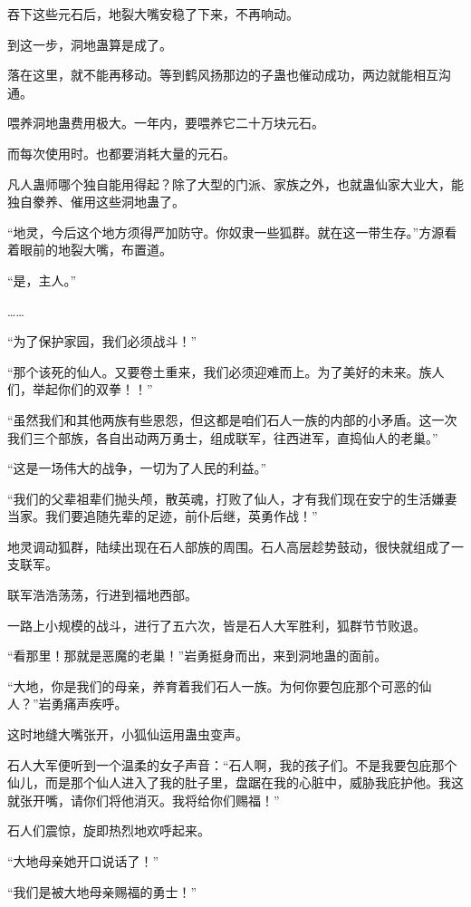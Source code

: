 \begin{this_body}
吞下这些元石后，地裂大嘴安稳了下来，不再响动。

到这一步，洞地蛊算是成了。

落在这里，就不能再移动。等到鹤风扬那边的子蛊也催动成功，两边就能相互沟通。

喂养洞地蛊费用极大。一年内，要喂养它二十万块元石。

而每次使用时。也都要消耗大量的元石。

凡人蛊师哪个独自能用得起？除了大型的门派、家族之外，也就蛊仙家大业大，能独自豢养、催用这些洞地蛊了。

“地灵，今后这个地方须得严加防守。你奴隶一些狐群。就在这一带生存。”方源看着眼前的地裂大嘴，布置道。

“是，主人。”

……

“为了保护家园，我们必须战斗！”

“那个该死的仙人。又要卷土重来，我们必须迎难而上。为了美好的未来。族人们，举起你们的双拳！！”

“虽然我们和其他两族有些恩怨，但这都是咱们石人一族的内部的小矛盾。这一次我们三个部族，各自出动两万勇士，组成联军，往西进军，直捣仙人的老巢。”

“这是一场伟大的战争，一切为了人民的利益。”

“我们的父辈祖辈们抛头颅，散英魂，打败了仙人，才有我们现在安宁的生活嫌妻当家。我们要追随先辈的足迹，前仆后继，英勇作战！”

地灵调动狐群，陆续出现在石人部族的周围。石人高层趁势鼓动，很快就组成了一支联军。

联军浩浩荡荡，行进到福地西部。

一路上小规模的战斗，进行了五六次，皆是石人大军胜利，狐群节节败退。

“看那里！那就是恶魔的老巢！”岩勇挺身而出，来到洞地蛊的面前。

“大地，你是我们的母亲，养育着我们石人一族。为何你要包庇那个可恶的仙人？”岩勇痛声疾呼。

这时地缝大嘴张开，小狐仙运用蛊虫变声。

石人大军便听到一个温柔的女子声音：“石人啊，我的孩子们。不是我要包庇那个仙儿，而是那个仙人进入了我的肚子里，盘踞在我的心脏中，威胁我庇护他。我这就张开嘴，请你们将他消灭。我将给你们赐福！”

石人们震惊，旋即热烈地欢呼起来。

“大地母亲她开口说话了！”

“我们是被大地母亲赐福的勇士！”


\end{this_body}

